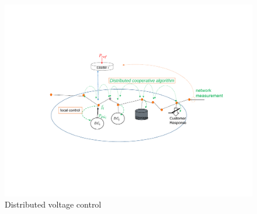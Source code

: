 \documentclass{article}
\begin{document}
\begin{figure}[ht]
    \centering
    \includegraphics[width=\linewidth]{pics/pf_ctrl.pdf}
    \caption{Distributed voltage control}
    \label{fig:pfctrl}
\end{figure}
\end{document}
